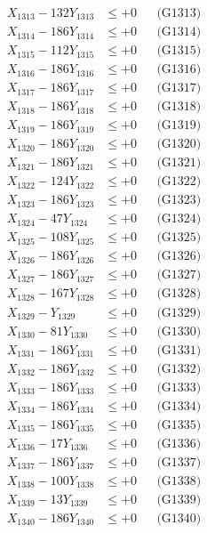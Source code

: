 \documentclass[a4paper,10pt]{article}
\begin{document}
{\begin{align}
X_{1313} - 132Y_{1313} &\leq +0 && \text{(G1313)} \\
X_{1314} - 186Y_{1314} &\leq +0 && \text{(G1314)} \\
X_{1315} - 112Y_{1315} &\leq +0 && \text{(G1315)} \\
X_{1316} - 186Y_{1316} &\leq +0 && \text{(G1316)} \\
X_{1317} - 186Y_{1317} &\leq +0 && \text{(G1317)} \\
X_{1318} - 186Y_{1318} &\leq +0 && \text{(G1318)} \\
X_{1319} - 186Y_{1319} &\leq +0 && \text{(G1319)} \\
X_{1320} - 186Y_{1320} &\leq +0 && \text{(G1320)} \\
\allowbreak
X_{1321} - 186Y_{1321} &\leq +0 && \text{(G1321)} \\
X_{1322} - 124Y_{1322} &\leq +0 && \text{(G1322)} \\
X_{1323} - 186Y_{1323} &\leq +0 && \text{(G1323)} \\
X_{1324} - 47Y_{1324} &\leq +0 && \text{(G1324)} \\
X_{1325} - 108Y_{1325} &\leq +0 && \text{(G1325)} \\
X_{1326} - 186Y_{1326} &\leq +0 && \text{(G1326)} \\
X_{1327} - 186Y_{1327} &\leq +0 && \text{(G1327)} \\
X_{1328} - 167Y_{1328} &\leq +0 && \text{(G1328)} \\
X_{1329} - Y_{1329} &\leq +0 && \text{(G1329)} \\
X_{1330} - 81Y_{1330} &\leq +0 && \text{(G1330)} \\
\allowbreak
X_{1331} - 186Y_{1331} &\leq +0 && \text{(G1331)} \\
X_{1332} - 186Y_{1332} &\leq +0 && \text{(G1332)} \\
X_{1333} - 186Y_{1333} &\leq +0 && \text{(G1333)} \\
X_{1334} - 186Y_{1334} &\leq +0 && \text{(G1334)} \\
X_{1335} - 186Y_{1335} &\leq +0 && \text{(G1335)} \\
X_{1336} - 17Y_{1336} &\leq +0 && \text{(G1336)} \\
X_{1337} - 186Y_{1337} &\leq +0 && \text{(G1337)} \\
X_{1338} - 100Y_{1338} &\leq +0 && \text{(G1338)} \\
X_{1339} - 13Y_{1339} &\leq +0 && \text{(G1339)} \\
X_{1340} - 186Y_{1340} &\leq +0 && \text{(G1340)} \\

\end{align}}
\end{document}
